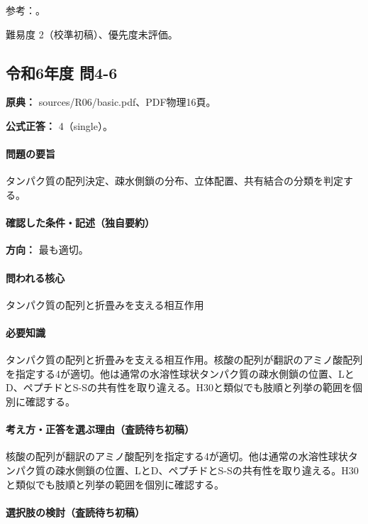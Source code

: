 \par 参考：\cite{mit_protein}。

\par 難易度 2（校準初稿）、優先度未評価。

\subsection{令和6年度 問4-6}
\label{q:r06-reg-basic-4-6}

\noindent\textbf{原典：} sources/R06/basic.pdf、PDF物理16頁。

\textbf{公式正答：} 4（single）。

\paragraph{問題の要旨} タンパク質の配列決定、疎水側鎖の分布、立体配置、共有結合の分類を判定する。

\paragraph{確認した条件・記述（独自要約）}\mbox{}\par

\noindent\textbf{方向：} 最も適切。\par

\paragraph{問われる核心} タンパク質の配列と折畳みを支える相互作用

\paragraph{必要知識} タンパク質の配列と折畳みを支える相互作用。核酸の配列が翻訳のアミノ酸配列を指定する4が適切。他は通常の水溶性球状タンパク質の疎水側鎖の位置、LとD、ペプチドとS-Sの共有性を取り違える。H30と類似でも肢順と列挙の範囲を個別に確認する。

\paragraph{考え方・正答を選ぶ理由（査読待ち初稿）} 核酸の配列が翻訳のアミノ酸配列を指定する4が適切。他は通常の水溶性球状タンパク質の疎水側鎖の位置、LとD、ペプチドとS-Sの共有性を取り違える。H30と類似でも肢順と列挙の範囲を個別に確認する。

\paragraph{選択肢の検討（査読待ち初稿）}\mbox{}\par


